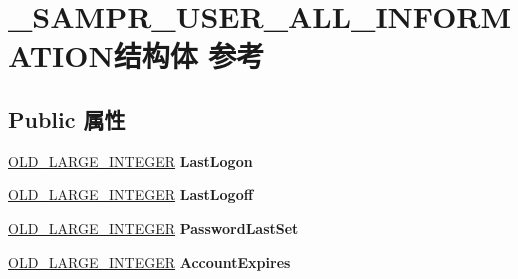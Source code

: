 \hypertarget{struct___s_a_m_p_r___u_s_e_r___a_l_l___i_n_f_o_r_m_a_t_i_o_n}{}\section{\+\_\+\+S\+A\+M\+P\+R\+\_\+\+U\+S\+E\+R\+\_\+\+A\+L\+L\+\_\+\+I\+N\+F\+O\+R\+M\+A\+T\+I\+O\+N结构体 参考}
\label{struct___s_a_m_p_r___u_s_e_r___a_l_l___i_n_f_o_r_m_a_t_i_o_n}
\subsection*{Public 属性}
\begin{DoxyCompactItemize}
\item 
\mbox{\label{struct___s_a_m_p_r___u_s_e_r___a_l_l___i_n_f_o_r_m_a_t_i_o_n_a41e96517bb4b04409257651a2c9aa126}} 
\hyperlink{struct___o_l_d___l_a_r_g_e___i_n_t_e_g_e_r}{O\+L\+D\+\_\+\+L\+A\+R\+G\+E\+\_\+\+I\+N\+T\+E\+G\+ER} {\bfseries Last\+Logon}
\item 
\mbox{\label{struct___s_a_m_p_r___u_s_e_r___a_l_l___i_n_f_o_r_m_a_t_i_o_n_a9cf127cc72dc3c05a6a46d42d47a18d9}} 
\hyperlink{struct___o_l_d___l_a_r_g_e___i_n_t_e_g_e_r}{O\+L\+D\+\_\+\+L\+A\+R\+G\+E\+\_\+\+I\+N\+T\+E\+G\+ER} {\bfseries Last\+Logoff}
\item 
\mbox{\label{struct___s_a_m_p_r___u_s_e_r___a_l_l___i_n_f_o_r_m_a_t_i_o_n_a22c740958f00c0e6209fac0fa66720f7}} 
\hyperlink{struct___o_l_d___l_a_r_g_e___i_n_t_e_g_e_r}{O\+L\+D\+\_\+\+L\+A\+R\+G\+E\+\_\+\+I\+N\+T\+E\+G\+ER} {\bfseries Password\+Last\+Set}
\item 
\mbox{\label{struct___s_a_m_p_r___u_s_e_r___a_l_l___i_n_f_o_r_m_a_t_i_o_n_ad6037c31197a8b0c0c9673043527fea0}} 
\hyperlink{struct___o_l_d___l_a_r_g_e___i_n_t_e_g_e_r}{O\+L\+D\+\_\+\+L\+A\+R\+G\+E\+\_\+\+I\+N\+T\+E\+G\+ER} {\bfseries Account\+Expires}
\item 
\mbox{\label{struct___s_a_m_p_r___u_s_e_r___a_l_l___i_n_f_o_r_m_a_t_i_o_n_a3936293477a429c075a43e165ec1c419}} 

\end{DoxyCompactItemize}
